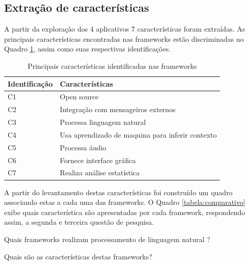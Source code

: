 \subsection{Extração de características}

A partir da exploração dos 4 aplicativos 7 características foram extraídas. As principais características encontradas nas frameworks estão discriminadas no Quadro \ref{tabela:caracteristicas}, assim como suas respectivas identiﬁcações.

\begin{table}[H]
    
    \begin{center}
    \begin{tabular}{| p{5cm}| p{5cm}|}
    \hline
     Identificação & Características\\
    \hline
    C1 & Open source\\
    \hline
    C2 & Integração com mensageiros externos \\
    \hline
    C3 &  Processa linguagem natural\\
    \hline
    C4 & Usa aprendizado de maquina para inferir contexto \\
    \hline
    C5 & Processa áudio \\
    \hline
    C6 & Fornece interface  gráfica \\
    \hline
    C7 & Realiza análise estatística \\
    \hline
   
    \end{tabular}
    \caption{ Principais características identificadas nas frameworks}
    \label{tabela:caracteristicas}
    \end{center}
   
\end{table}

A partir do levantamento destas características foi construído um quadro associando estas a cada uma das frameworks. O Quadro \ref{tabela:comparativo} exibe quais característica são apresentadas por cada framework, respondendo assim, a segunda e terceira questão de pesquisa.

Quais frameworks realizam processamento de linguagem natural ?

Quais são as características destas frameworks?


